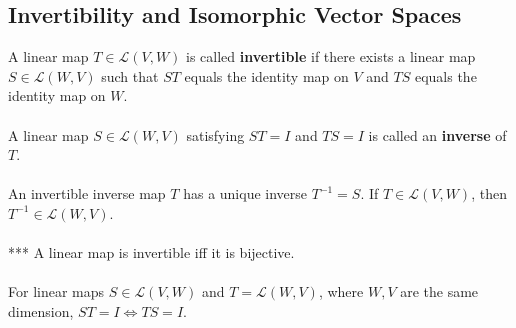 \documentclass{article}
\theoremstyle{definition}
\begin{document}
\subsection*{Invertibility and Isomorphic Vector Spaces}
A linear map $T \in \mathcal{L}(V, W)$ is called \textbf{invertible} if there exists a linear map $S \in \mathcal{L}(W, V)$ such that $ST$ equals the identity map on $V$ and $TS$ equals the identity map on $W$. \\ \\
A linear map $S \in \mathcal{L}(W, V)$ satisfying $ST = I$ and $TS = I$ is called an \textbf{inverse} of $T$. \\ \\
An invertible inverse map $T$ has a unique inverse $T^{-1} = S$. If $T \in \mathcal{L}(V, W)$, then $T^{-1} \in \mathcal{L}(W, V)$. \\ \\
*** A linear map is invertible iff it is bijective. \\ \\
For linear maps $S \in \mathcal{L}(V, W)$ and $T = \mathcal{L}(W, V)$, where $W, V$ are the same dimension, $ST = I \iff TS = I$.
\end{document}
